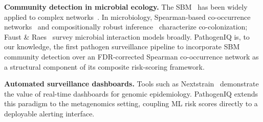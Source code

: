 \documentclass[conference]{IEEEtran}
\begin{document}
\textbf{Community detection in microbial ecology.}
The SBM~\cite{Holland1983,Karrer2011} has been widely applied to complex
networks~\cite{Newman2006,Blondel2008}. In microbiology, Spearman-based
co-occurrence networks~\cite{Barber2012} and compositionally robust
inference~\cite{Kurtz2015} characterize co-colonization; Faust \&
Raes~\cite{Faust2012} survey microbial interaction models broadly.
PathogenIQ is, to our knowledge, the first pathogen surveillance pipeline
to incorporate SBM community detection over an FDR-corrected Spearman
co-occurrence network as a structural component of its composite
risk-scoring framework.

\textbf{Automated surveillance dashboards.}
Tools such as Nextstrain~\cite{Hadfield2018} demonstrate the value of
real-time dashboards for genomic epidemiology. PathogenIQ extends this
paradigm to the metagenomics setting, coupling ML risk scores directly
to a deployable alerting interface.
\end{document}
